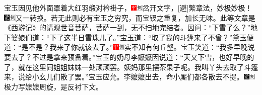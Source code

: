 宝玉因见他外面罩着大红羽缎对衿褂子，{{\includegraphics[width=3mm]{../Images/00002}\includegraphics[width=3mm]{../Images/00011}\footnotesize \kaishu 岔开文字，{[}避{]}繁章法，妙极妙极！　}\includegraphics[width=3mm]{../Images/00006}\includegraphics[width=3mm]{../Images/00011}\footnotesize \kaishu 又一转换。若无此则必有宝玉之穷究，而宝钗之重复，加长无味。此等文章是《西游记》的请观世音菩萨，菩萨一到，无不扫地完结者。}因问：``下雪了么？''地下婆娘们道：``下了这半日雪珠儿了。''宝玉道：``取了我的斗篷来了不曾？''黛玉便道：``是不是？我来了你就该去了。''{\includegraphics[width=3mm]{../Images/00002}\includegraphics[width=3mm]{../Images/00011}\footnotesize \kaishu 实不知有何丘壑。}宝玉笑道：``我多早晚说要去了？不过是拿来预备着。''宝玉的奶母李嬷嬷因说道：``天又下雪，也好早晚的了，就在这里同姐姐妹妹一处顽顽罢。姨妈那里摆茶果子呢。我叫丫头去取了斗篷来，说给小幺儿们散了罢。''宝玉应允。李嬷嬷出去，命小厮们都各散去不提。{\includegraphics[width=3mm]{../Images/00006}\includegraphics[width=3mm]{../Images/00011}\footnotesize \kaishu 极力写嬷嬷周旋，是反衬下文。}

